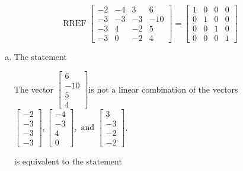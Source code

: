 \begin{exerciseAnswer} 
\[\operatorname{RREF}  \left[\begin{array}{ccc|c}
-2 & -4 & 3 & 6 \\
-3 & -3 & -3 & -10 \\
-3 & 4 & -2 & 5 \\
-3 & 0 & -2 & 4
\end{array}\right] = \left[\begin{array}{ccc|c}
1 & 0 & 0 & 0 \\
0 & 1 & 0 & 0 \\
0 & 0 & 1 & 0 \\
0 & 0 & 0 & 1
\end{array}\right] \]
\begin{enumerate}[(a)]
\item  The statement 
\begin{center}\begin{minipage}{0.8\textwidth}
 The vector \( \left[\begin{array}{c}
6 \\
-10 \\
5 \\
4
\end{array}\right] \)is not a linear combination of the vectors \( \left[\begin{array}{c}
-2 \\
-3 \\
-3 \\
-3
\end{array}\right] , \left[\begin{array}{c}
-4 \\
-3 \\
4 \\
0
\end{array}\right] , \text{ and } \left[\begin{array}{c}
3 \\
-3 \\
-2 \\
-2
\end{array}\right] \). 
\end{minipage}\end{center}
     is equivalent to the statement 
\begin{center}\begin{minipage}{0.8\textwidth}
 The vector equation \( x_{1} \left[\begin{array}{c}
-2 \\
-3 \\
-3 \\

\end{array}
\end{minipage}
\end{center}
\end{enumerate}
\end{exerciseAnswer}
